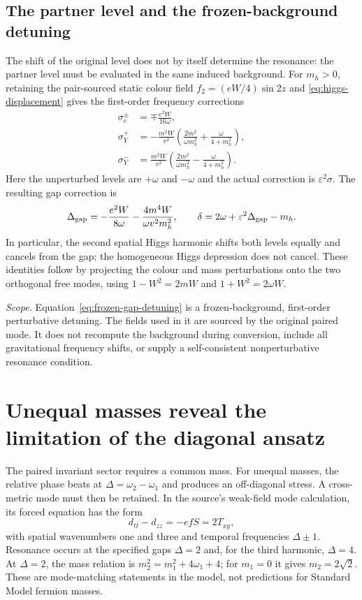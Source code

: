 \documentclass[11pt,a4paper,oneside]{book}
\theoremstyle{plain}
\theoremstyle{definition}
\theoremstyle{remark}
\newcommand{\src}[2]{\cite{#1}}
\newcommand{\scope}[1]{\par\smallskip\noindent\textit{Scope.} #1\par\smallskip}
\begin{document}
\subsection{The partner level and the frozen-background detuning}
The shift of the original level does not by itself determine the resonance:
the partner level must be evaluated in the same induced background.  For
$m_h>0$, retaining the pair-sourced static colour field
$f_2=(eW/4)\sin2z$ and \eqref{eq:higgs-displacement} gives the first-order
frequency corrections
\begin{align}
 \sigma_c^{\pm}&=\mp\frac{e^2W}{16\omega},\\
 \sigma_Y^+&=-\frac{m^2W}{v^2}
     \left(\frac{2m^2}{\omega m_h^2}+\frac{\omega}{4+m_h^2}\right),\\
 \sigma_Y^-&=\frac{m^2W}{v^2}
     \left(\frac{2m^2}{\omega m_h^2}-\frac{\omega}{4+m_h^2}\right).
 \label{eq:paired-level-shifts}
\end{align}
Here the unperturbed levels are $+\omega$ and $-\omega$ and the actual
correction is $\varepsilon^2\sigma$.  The resulting gap correction is
\begin{equation}
 \Delta_{\rm gap}
 =-\frac{e^2W}{8\omega}
   -\frac{4m^4W}{\omega v^2m_h^2},\qquad
 \delta=2\omega+\varepsilon^2\Delta_{\rm gap}-m_h.
 \label{eq:frozen-gap-detuning}
\end{equation}
In particular, the second spatial Higgs harmonic shifts both levels
equally and cancels from the gap; the homogeneous Higgs depression does
not cancel.  These identities follow by projecting the colour and mass
perturbations onto the two orthogonal free modes, using
$1-W^2=2mW$ and $1+W^2=2\omega W$.
\src{R20}{thm:v20v27-shifts}

\scope{Equation~\eqref{eq:frozen-gap-detuning} is a frozen-background,
first-order perturbative detuning.  The fields used in it are sourced by
the original paired mode.  It does not recompute the background during
conversion, include all gravitational frequency shifts, or supply a
self-consistent nonperturbative resonance condition.}


\section{Unequal masses reveal the limitation of the diagonal ansatz}
The paired invariant sector requires a common mass. For unequal masses, the relative phase beats at $\Delta=\omega_2-\omega_1$ and produces an off-diagonal stress. A cross-metric mode must then be retained. In the source's weak-field mode calculation, its forced equation has the form
\begin{equation}
 d_{tt}-d_{zz}=-efS=2T_{xy},
\end{equation}
with spatial wavenumbers one and three and temporal frequencies $\Delta\pm1$. Resonance occurs at the specified gaps $\Delta=2$ and, for the third harmonic, $\Delta=4$. At $\Delta=2$, the mass relation is $m_2^2=m_1^2+4\omega_1+4$; for $m_1=0$ it gives $m_2=2\sqrt2$. These are mode-matching statements in the model, not predictions for Standard Model fermion masses. \cite{R20}
\end{document}
